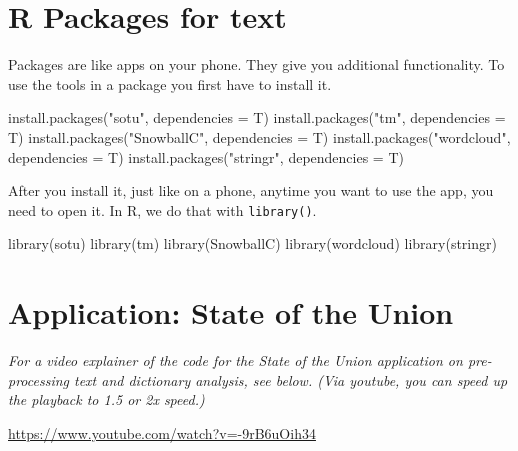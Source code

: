 \documentclass[
  letterpaper,
  DIV=11,
  numbers=noendperiod]{scrreprt}
\newenvironment{Shaded}{\begin{snugshade}}{\end{snugshade}}
\newcommand{\AttributeTok}[1]{\textcolor[rgb]{0.40,0.45,0.13}{#1}}
\newcommand{\FunctionTok}[1]{\textcolor[rgb]{0.28,0.35,0.67}{#1}}
\newcommand{\NormalTok}[1]{\textcolor[rgb]{0.00,0.23,0.31}{#1}}
\newcommand{\StringTok}[1]{\textcolor[rgb]{0.13,0.47,0.30}{#1}}
\begin{document}
\hypertarget{r-packages-for-text}{%
\section{R Packages for text}\label{r-packages-for-text}}

Packages are like apps on your phone. They give you additional
functionality. To use the tools in a package you first have to install
it.

\begin{Shaded}
\begin{Highlighting}[]
\FunctionTok{install.packages}\NormalTok{(}\StringTok{"sotu"}\NormalTok{, }\AttributeTok{dependencies =}\NormalTok{ T)}
\FunctionTok{install.packages}\NormalTok{(}\StringTok{"tm"}\NormalTok{, }\AttributeTok{dependencies =}\NormalTok{ T)}
\FunctionTok{install.packages}\NormalTok{(}\StringTok{"SnowballC"}\NormalTok{, }\AttributeTok{dependencies =}\NormalTok{ T)}
\FunctionTok{install.packages}\NormalTok{(}\StringTok{"wordcloud"}\NormalTok{, }\AttributeTok{dependencies =}\NormalTok{ T)}
\FunctionTok{install.packages}\NormalTok{(}\StringTok{"stringr"}\NormalTok{, }\AttributeTok{dependencies =}\NormalTok{ T)}
\end{Highlighting}
\end{Shaded}

After you install it, just like on a phone, anytime you want to use the
app, you need to open it. In R, we do that with \texttt{library()}.

\begin{Shaded}
\begin{Highlighting}[]
\FunctionTok{library}\NormalTok{(sotu)}
\FunctionTok{library}\NormalTok{(tm)}
\FunctionTok{library}\NormalTok{(SnowballC)}
\FunctionTok{library}\NormalTok{(wordcloud)}
\FunctionTok{library}\NormalTok{(stringr)}
\end{Highlighting}
\end{Shaded}

\hypertarget{application-state-of-the-union}{%
\section{Application: State of the
Union}\label{application-state-of-the-union}}

\emph{For a video explainer of the code for the State of the Union
application on pre-processing text and dictionary analysis, see below.
(Via youtube, you can speed up the playback to 1.5 or 2x speed.)}

\url{https://www.youtube.com/watch?v=-9rB6uOih34}
\end{document}
